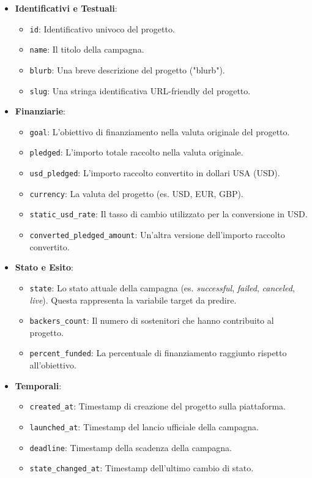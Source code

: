 \documentclass[a4paper,14pt]{extarticle}
\begin{document}
\begin{itemize}
    \item \textbf{Identificativi e Testuali}:
    \begin{itemize}
        \item \texttt{id}: Identificativo univoco del progetto.
        \item \texttt{name}: Il titolo della campagna.
        \item \texttt{blurb}: Una breve descrizione del progetto ("blurb").
        \item \texttt{slug}: Una stringa identificativa URL-friendly del progetto.
    \end{itemize}

    \item \textbf{Finanziarie}:
    \begin{itemize}
        \item \texttt{goal}: L'obiettivo di finanziamento nella valuta originale del progetto.
        \item \texttt{pledged}: L'importo totale raccolto nella valuta originale.
        \item \texttt{usd\_pledged}: L'importo raccolto convertito in dollari USA (USD).
        \item \texttt{currency}: La valuta del progetto (es. USD, EUR, GBP).
        \item \texttt{static\_usd\_rate}: Il tasso di cambio utilizzato per la conversione in USD.
        \item \texttt{converted\_pledged\_amount}: Un'altra versione dell'importo raccolto convertito.
    \end{itemize}

    \item \textbf{Stato e Esito}:
    \begin{itemize}
        \item \texttt{state}: Lo stato attuale della campagna (es. \textit{successful}, \textit{failed}, \textit{canceled}, \textit{live}). Questa rappresenta la variabile target da predire.
        \item \texttt{backers\_count}: Il numero di sostenitori che hanno contribuito al progetto.
        \item \texttt{percent\_funded}: La percentuale di finanziamento raggiunto rispetto all'obiettivo.
    \end{itemize}

    \item \textbf{Temporali}:
    \begin{itemize}
        \item \texttt{created\_at}: Timestamp di creazione del progetto sulla piattaforma.
        \item \texttt{launched\_at}: Timestamp del lancio ufficiale della campagna.
        \item \texttt{deadline}: Timestamp della scadenza della campagna.
        \item \texttt{state\_changed\_at}: Timestamp dell'ultimo cambio di stato.
    \end{itemize}


\end{itemize}
\end{document}
